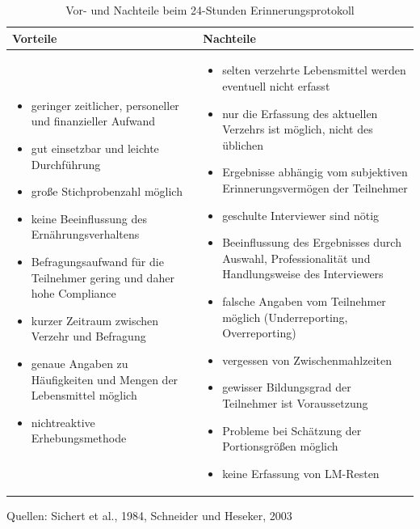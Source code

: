 

\begin{table}[!h]
\begin{flushleft}
\caption{Vor- und Nachteile beim 24-Stunden Erinnerungsprotokoll}
\end{flushleft}
\begin{tabular}{p{7cm} p{7cm}}
Vorteile & Nachteile \\
\hline

\begin{itemize}
\item geringer zeitlicher, personeller und finanzieller Aufwand
\item gut einsetzbar und leichte Durchführung
\item große Stichprobenzahl möglich
\item keine Beeinflussung des Ernährungsverhaltens
\item Befragungsaufwand für die Teilnehmer gering und daher hohe Compliance
\item kurzer Zeitraum zwischen Verzehr und Befragung
\item genaue Angaben zu Häufigkeiten und Mengen der Lebensmittel möglich
\item nichtreaktive Erhebungsmethode

\end{itemize}

&

\begin{itemize}
\item selten verzehrte Lebensmittel werden eventuell nicht erfasst
\item nur die Erfassung des aktuellen Verzehrs ist möglich, nicht des üblichen
\item Ergebnisse abhängig vom subjektiven Erinnerungsvermögen der Teilnehmer
\item geschulte Interviewer sind nötig
\item Beeinflussung des Ergebnisses durch Auswahl, Professionalität und Handlungsweise des Interviewers 
\item falsche Angaben vom Teilnehmer möglich (Underreporting, Overreporting)
\item vergessen von Zwischenmahlzeiten
\item gewisser Bildungsgrad der Teilnehmer ist Voraussetzung
\item Probleme bei Schätzung der Portionsgrößen möglich
\item keine Erfassung von LM-Resten

\end{itemize}
\end{tabular}
\label{tab:24-Stunden}
Quellen: Sichert et al., 1984, Schneider und Heseker, 2003
\end{table}

